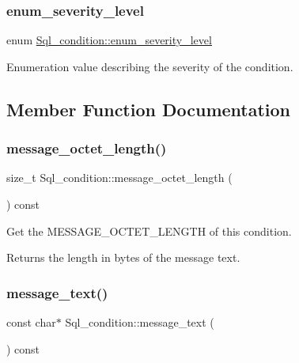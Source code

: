 \subsubsection{\texorpdfstring{enum\+\_\+severity\+\_\+level}{enum\_severity\_level}}
{\footnotesize\ttfamily enum \mbox{\hyperlink{classSql__condition_ab0602581e19cddb609bfe10c44be4e83}{Sql\+\_\+condition\+::enum\+\_\+severity\+\_\+level}}}

Enumeration value describing the severity of the condition. 

\subsection{Member Function Documentation}
\mbox{\label{classSql__condition_a3bcb85e06992f8c792723698b14068aa}} 
\subsubsection{\texorpdfstring{message\+\_\+octet\+\_\+length()}{message\_octet\_length()}}
{\footnotesize\ttfamily size\+\_\+t Sql\+\_\+condition\+::message\+\_\+octet\+\_\+length (\begin{DoxyParamCaption}{ }\end{DoxyParamCaption}) const\hspace{0.3cm}{\ttfamily [inline]}}

Get the M\+E\+S\+S\+A\+G\+E\+\_\+\+O\+C\+T\+E\+T\+\_\+\+L\+E\+N\+G\+TH of this condition. \begin{DoxyReturn}{Returns}
the length in bytes of the message text. 
\end{DoxyReturn}
\mbox{\label{classSql__condition_a5c53594f4d2c304328386ddcff4a3e8c}} 
\subsubsection{\texorpdfstring{message\+\_\+text()}{message\_text()}}
{\footnotesize\ttfamily const char$\ast$ Sql\+\_\+condition\+::message\+\_\+text (\begin{DoxyParamCaption}{ }\end{DoxyParamCaption}) const\hspace{0.3cm}{\ttfamily [inline]}}

